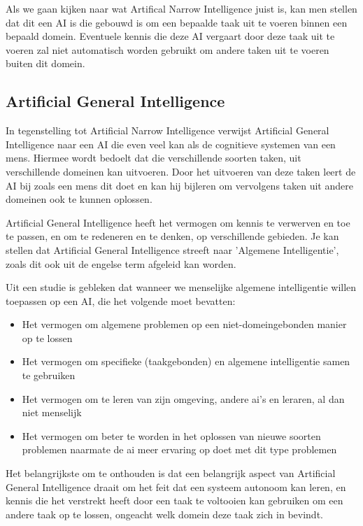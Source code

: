 Als we gaan kijken naar wat Artifical Narrow Intelligence juist is, kan men stellen dat dit een AI is die gebouwd is om een bepaalde taak uit te voeren binnen een bepaald domein. Eventuele kennis die deze AI vergaart door deze taak uit te voeren zal niet automatisch worden gebruikt om andere taken uit te voeren buiten dit domein. 

\subsection{Artificial General Intelligence}

In tegenstelling tot Artificial Narrow Intelligence verwijst Artificial General Intelligence naar een AI die even veel kan als de cognitieve systemen van een mens. Hiermee wordt bedoelt dat die verschillende soorten taken, uit verschillende domeinen kan uitvoeren. Door het uitvoeren van deze taken leert de AI bij zoals een mens dit doet en kan hij bijleren om vervolgens taken uit andere domeinen ook te kunnen oplossen. 

Artificial General Intelligence heeft het vermogen om kennis te verwerven en toe te passen, en om te redeneren en te denken, op verschillende gebieden. Je kan stellen dat Artificial General Intelligence streeft naar 'Algemene Intelligentie', zoals dit ook uit de engelse term afgeleid kan worden. 

Uit een studie is gebleken dat wanneer we menselijke algemene intelligentie willen toepassen op een AI, die het volgende moet bevatten: \linebreak

\begin{itemize}
    \item Het vermogen om algemene problemen op een niet-domeingebonden manier op te lossen
    \item Het vermogen om specifieke (taakgebonden) en algemene intelligentie samen te gebruiken
    \item Het vermogen om te leren van zijn omgeving, andere ai's en leraren, al dan niet menselijk
    \item Het vermogen om beter te worden in het oplossen van nieuwe soorten problemen naarmate de ai meer ervaring op doet met dit type problemen
\end{itemize}

Het belangrijkste om te onthouden is dat een belangrijk aspect van Artificial General Intelligence draait om het feit dat een systeem autonoom kan leren, en kennis die het verstrekt heeft door een taak te voltooien kan gebruiken om een andere taak op te lossen, ongeacht welk domein deze taak zich in bevindt. 

